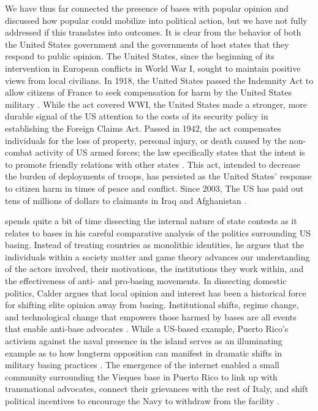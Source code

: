 {	We have thus far connected the presence of bases with popular opinion and discussed how popular could mobilize into political action, but we have not fully addressed if this translates into outcomes. It is clear from the behavior of both the United States government and the governments of host states that they respond to public opinion. The United States, since the beginning of its intervention in European conflicts in World War I, sought to maintain positive views from local civilians. In 1918, the United States passed the Indemnity Act to allow citizens of France to seek compensation for harm by the United States military \cite{walerstein2009}.  While the act covered WWI, the United States made a stronger, more durable signal of the US attention to the costs of its security policy in establishing the Foreign Claims Act. Passed in 1942, the act compensates individuals for the loss of property, personal injury, or death caused by the non-combat activity of US armed forces; the law specifically states that the intent is to promote friendly relations with other states \cite{ForeignClaims1942}. This act, intended to decrease the burden of deployments of troops, has persisted as the United States' response to citizen harm in times of peace and conflict. Since 2003, The US has paid out tens of millions of dollars to claimants in Iraq and Afghanistan \cite{Currier2015}.
	
	 spends quite a bit of time dissecting the internal nature of state contests as it relates to bases in his careful comparative analysis of the politics surrounding US basing. Instead of treating countries as monolithic identities, he argues that the individuals within a society matter and game theory advances our understanding of the actors involved, their motivations, the institutions they work within, and the effectiveness of anti- and pro-basing movements. In dissecting domestic politics, Calder argues that local opinion and interest has been a historical force for shifting elite opinion away from basing. Institutional shifts, regime change, and technological change that empowers those harmed by bases are all events that enable anti-base advocates \cite{calder2007,cooley2008}. While a US-based example, Puerto Rico's activism against the naval presence in the island serves as an illuminating example as to how longterm opposition can manifest in dramatic shifts in military basing practices \cite{mccaffery2009}. The emergence of the internet enabled a small community surrounding the Vieques base in Puerto Rico to link up with transnational advocates, connect their grievances with the rest of Italy, and shift political incentives to encourage the Navy to withdraw from the facility \cite[p. 176-183]{calder2007}.

}
